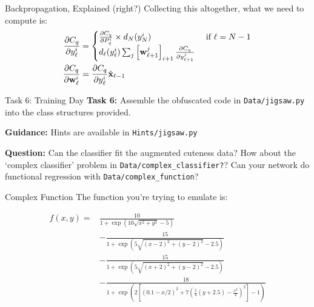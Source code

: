 \documentclass[]{SangerLibrary/sanger-present}
\renewcommand\vec[1]{\boldsymbol{\mathbf{#1}}}
\begin{document}
	\begin{frame}{Backpropagation, Explained (right?)}
		Collecting this altogether, what we need to compute is:
		\begin{align*}
				\pdiv{C_q}{y_\ell^i} & = \begin{cases} \pdiv{C_q}{P_q^i} \times d_N(y_N^i) & \text{ if $\ell = N-1$}
					\\
					d_\ell(y_\ell^i) \sum_{j}  \left[ \vec{w}_{\ell+1}^j \right]_{i+1} \pdiv{C_q}{y_{\ell+1}^j}
					\end{cases}
				\\
				\pdiv{C_q}{\vec{w}_\ell^i} & = \pdiv{C_q}{y_\ell^i} \tilde{\vec{x}}_{\ell-1}
		\end{align*}
	\end{frame}


	\begin{frame}[fragile]{Task 6: Training Day}
		\textbf{Task 6:} Assemble the obfuscated code in \verb|Data/jigsaw.py| into the class structures provided.

		\vspace{1cm}

		\pause \textbf{Guidance:} Hints are available in  \verb|Hints/jigsaw.py|
			
		\vspace{1cm}

		\pause \textbf{Question:} Can the classifier fit the augmented cuteness data? How about the `complex classifier' problem in \verb|Data/complex_classifier?|? Can your network do functional regression with \verb|Data/complex_function|?
	\end{frame}

	\begin{frame}{Complex Function}
		The function you're trying to emulate is:

		\begin{align*}
			f(x,y) = & \frac{10}{1 + \exp\left(10\sqrt{x^2 + y^2} -5\right)}
			\\
			& - \frac{15}{1 + \exp\left(5\sqrt{(x-2)^2 + (y-2)^2}-2.5\right)}
			\\
			& - \frac{15}{1 + \exp\left(5\sqrt{(x+2)^2 + (y-2)^2}-2.5\right)}
			\\
			& - \frac{18}{1 + \exp\left(2\left[(0.1-x/2)^2 + 7\left(\frac{5}{4}(y+2.5) - \frac{x^2}{4}\right)^2\right] - 1\right)}
		\end{align*}
	\end{frame}
\end{document}
